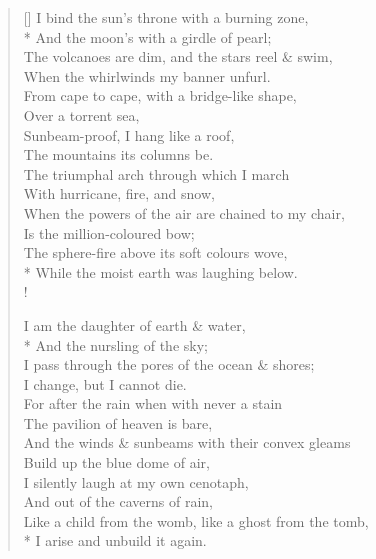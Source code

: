 \documentclass[MAIN]{subfiles}
\begin{document}
\begin{verse}[\versewidth]
I bind the sun's throne with a burning zone,\\*
\vin And the moon's with a girdle of pearl;\\
The volcanoes are dim, and the stars reel \& swim,\\
\vin When the whirlwinds my banner unfurl.\\
From cape to cape, with a bridge-like shape,\\
\vin Over a torrent sea,\\
Sunbeam-proof, I hang like a roof,\\
\vin The mountains its columns be.\\
The triumphal arch through which I march\\
\vin With hurricane, fire, and snow,\\
When the powers of the air are chained to my chair,\\
\vin Is the million-coloured bow;\\
The sphere-fire above its soft colours wove,\\*
\vin While the moist earth was laughing below.\\!

I am the daughter of earth \& water,\\*
\vin And the nursling of the sky;\\
I pass through the pores of the ocean \& shores;\\
\vin I change, but I cannot die.\\
For after the rain when with never a stain\\
\vin The pavilion of heaven is bare,\\
And the winds \& sunbeams with their convex gleams\\
\vin Build up the blue dome of air,\\
I silently laugh at my own cenotaph,\\
\vin And out of the caverns of rain,\\
Like a child from the womb, like a ghost from the tomb,\\*
\vin I arise and unbuild it again.
\end{verse}
\end{document}
